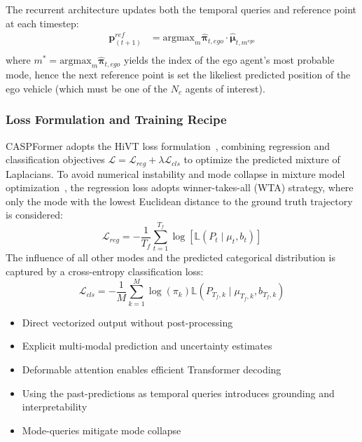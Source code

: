 \begin{description}[leftmargin=1em,itemsep=2pt]
\begin{description}[leftmargin=1em,itemsep=2pt]
The recurrent architecture updates both the temporal queries and reference point at each timestep:
\begin{equation}
\label{eq:recurrent_updates}
\begin{aligned}
\mathbf{p}^{ref}_{(t+1)} &= \text{argmax}_m \hat{\boldsymbol{\pi}}_{t,ego} \cdot \hat{\boldsymbol{\mu}}_{t,m^{ego}} \\
\end{aligned}
\end{equation}
where \(m^* = \text{argmax}_m \hat{\boldsymbol{\pi}}_{t,ego}\) yields the index of the ego agent's most probable mode, hence the next reference point is set the likeliest predicted position of the ego vehicle (which must be one of the \( N_c \) agents of interest).
\end{description}

\subsubsection{Loss Formulation and Training Recipe}
\label{par:casp_loss_formulation}
CASPFormer adopts the HiVT loss formulation~\cite{zhou2022hivt}, combining regression and classification objectives \(\mathcal{L} = \mathcal{L}_{reg} + \lambda \mathcal{L}_{cls}\) to optimize the predicted mixture of Laplacians.
To avoid numerical instability and mode collapse in mixture model optimization~\cite{rupprecht2017learning}, the regression loss adopts winner-takes-all (WTA) strategy, where only the mode with the lowest Euclidean distance to the ground truth trajectory is considered:
\begin{equation}
  \label{eq:caspformer_regression_loss}
  \mathcal{L}_{reg} = -\frac{1}{T_f} \sum_{t=1}^{T_f} \log[\mathbb{L}(P_t \mid \mu_t, b_t)]
\end{equation}
The influence of all other modes and the predicted categorical distribution is captured by a cross-entropy classification loss:
\begin{equation}
  \label{eq:caspformer_classification_loss}
  \mathcal{L}_{cls} = -\frac{1}{M} \sum_{k=1}^{M} \log(\pi_k) \mathbb{L}(P_{T_f, k} \mid \mu_{T_f, k}, b_{T_f, k})
\end{equation}
\end{description}

\begin{itemize}[leftmargin=*, label=\greenoplus]
  \item Direct vectorized output without post-processing
  \item Explicit multi-modal prediction and uncertainty estimates
  \item Deformable attention enables efficient Transformer decoding
  \item Using the past-predictions as temporal queries introduces grounding and interpretability
  \item Mode-queries mitigate mode collapse
\end{itemize}

